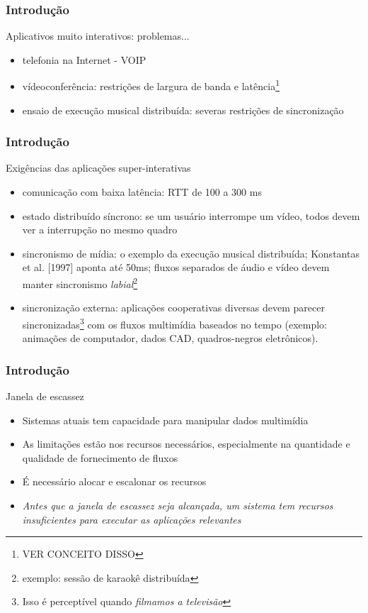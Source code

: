 \documentclass[]{beamer}
\begin{document}
\begin{frame}
  \frametitle{Introdução}
Aplicativos muito interativos: problemas...
\begin{itemize}
  \item telefonia na Internet - VOIP
  \item vídeoconferência: restrições de largura de banda e latência\footnote{VER CONCEITO DISSO}
  \item ensaio de execução musical distribuída: severas restrições de sincronização
\end{itemize}
\end{frame}

\begin{frame}
  \frametitle{Introdução}
Exigências das aplicações super-interativas
\begin{itemize}
  \item comunicação com baixa latência: RTT de 100 a 300 ms
  \item estado distribuído síncrono: se um usuário interrompe um vídeo, todos devem 
ver a interrupção no mesmo quadro
  \item sincronismo de mídia: o exemplo da execução musical distribuída; 
Konstantas et al. [1997] aponta até 50ms; fluxos separados de áudio e vídeo devem manter
sincronismo \emph{labial}\footnote{exemplo: sessão de karaokê distribuída}
  \item sincronização externa: aplicações cooperativas diversas devem parecer 
sincronizadas\footnote{Isso é perceptível quando \emph{filmamos a televisão}}
com os fluxos multimídia baseados no tempo (exemplo: animações de computador, dados CAD, 
quadros-negros eletrônicos).
\end{itemize}
\end{frame}

\begin{frame}
  \frametitle{Introdução}
Janela de escassez
\begin{itemize}
  \item Sistemas atuais tem capacidade para manipular dados multimídia
  \item As limitações estão nos recursos necessários, especialmente 
na quantidade e qualidade de fornecimento de fluxos
  \item É necessário alocar e escalonar os recursos
  \item \emph{Antes que a janela de escassez seja alcançada, 
um sistema tem recursos insuficientes para executar as aplicações relevantes}
\end{itemize}
\end{frame}
\end{document}
